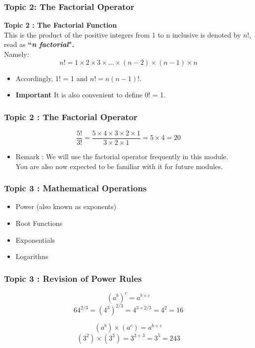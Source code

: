 \documentclass{beamer}
\begin{document}
\begin{frame}
	\frametitle{Topic 2: The Factorial Operator}
	\large
	\textbf{Topic 2 : The Factorial Function}\\ 
	This is the product of the positive integers from 1 to n inclusive is denoted by $n!$, read as \textbf{``\textit{n factorial}".}\\ \smallskip Namely:
	\[n! = 1 \times 2 \times 3 \times \ldots \times (n-2) \times(n-1)\times n\] 
	\begin{itemize}
		\item Accordingly, 1! = 1 and $n! = n(n - 1)!$. 
		
		\item \textbf{Important} It is also convenient to define 0! = 1.
	\end{itemize}	
\end{frame}
\begin{frame}
	\frametitle{Topic 2 : The Factorial Operator}	\large
	{
		\Large
	\[ \frac{5!}{3!} = \frac{5 \times 4 \times 3 \times 2 \times 1}{ 3 \times 2 \times 1 }  = 5 \times 4 = 20 \]
}
	\begin{itemize}
		\item Remark :  We will use the factorial operator frequently in this module. \\ You are also now expected to be familiar with it for future modules.
	\end{itemize}
\end{frame}
\begin{frame}
		\frametitle{Topic 3 : Mathematical Operations}	\large

	\begin{itemize}
	\item Power (also known as exponents)
	\item Root Functions
	\item Exponentials
	\item Logarithns
\end{itemize}
\end{frame}
\begin{frame}
	\frametitle{Topic 3 : Revision of Power Rules}
\LARGE
	\[ (a^b)^c = a^{b \times c}\]
		\[ 64^{2/3} =  (4^3)^{2/3} = 4^{3\times2/3} = 4^2 = 16 \]
	\bigskip
	
	\[ (a^b) \times (a^c) = a^{b+c}\]
	\[ (3^2) \times (3^3) = 3^{2+3} = 3^5  =243 \]
\end{frame}
\end{document}
